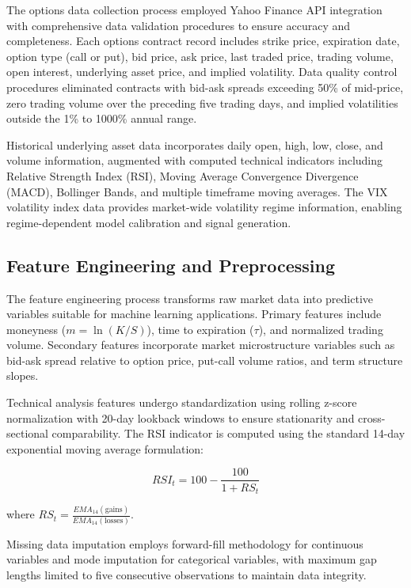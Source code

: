 \documentclass[12pt,a4paper]{article}
\begin{document}
The options data collection process employed Yahoo Finance API integration with comprehensive data validation procedures to ensure accuracy and completeness. Each options contract record includes strike price, expiration date, option type (call or put), bid price, ask price, last traded price, trading volume, open interest, underlying asset price, and implied volatility. Data quality control procedures eliminated contracts with bid-ask spreads exceeding 50\% of mid-price, zero trading volume over the preceding five trading days, and implied volatilities outside the 1\% to 1000\% annual range.

Historical underlying asset data incorporates daily open, high, low, close, and volume information, augmented with computed technical indicators including Relative Strength Index (RSI), Moving Average Convergence Divergence (MACD), Bollinger Bands, and multiple timeframe moving averages. The VIX volatility index data provides market-wide volatility regime information, enabling regime-dependent model calibration and signal generation.

\subsection{Feature Engineering and Preprocessing}

The feature engineering process transforms raw market data into predictive variables suitable for machine learning applications. Primary features include moneyness ($m = \ln(K/S)$), time to expiration ($\tau$), and normalized trading volume. Secondary features incorporate market microstructure variables such as bid-ask spread relative to option price, put-call volume ratios, and term structure slopes.

Technical analysis features undergo standardization using rolling z-score normalization with 20-day lookback windows to ensure stationarity and cross-sectional comparability. The RSI indicator is computed using the standard 14-day exponential moving average formulation:

\begin{equation}
RSI_t = 100 - \frac{100}{1 + RS_t}
\end{equation}

where $RS_t = \frac{EMA_{14}(\text{gains})}{EMA_{14}(\text{losses})}$.

Missing data imputation employs forward-fill methodology for continuous variables and mode imputation for categorical variables, with maximum gap lengths limited to five consecutive observations to maintain data integrity.
\end{document}
